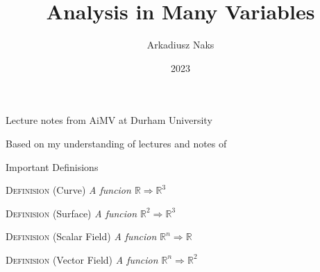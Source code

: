 \documentclass[12pt, letterpaper]{article}
\title{Analysis in Many Variables}
\author{Arkadiusz Naks}
\date{2023}
\newcommand{\R}{\mathbb{R}}
\begin{document}
\begin{titlepage}
  \begin{center}
    \makeatletter
    \vspace*{1cm}
    \Huge
    \textbf{\@title}

    \vspace{0.5cm}
    \Large
    Lecture notes from AiMV at Durham University

    \vspace{1.5cm}

    \textbf{\@author}

    \vfill

    \vspace{0.8cm}

    \small
    Based on my understanding of lectures and notes of \\
    \@date{}
  \end{center}
\end{titlepage}

\tableofcontents
\newpage

\begin{section}{Important Definisions}

  \textsc{Definision} (Curve) \textit{A funcion \(\R \Rightarrow \R^{3}\)}

  \textsc{Definision} (Surface) \textit{A funcion \(\R^{2} \Rightarrow \R^{3}\)
  }

  \textsc{Definision} (Scalar Field) \textit{A funcion \(\R^{n} \Rightarrow \R
    \)}

  \textsc{Definision} (Vector Field) \textit{A funcion \(\R^{n} \Rightarrow
    \R^{2}\)}

\end{section}
\end{document}
